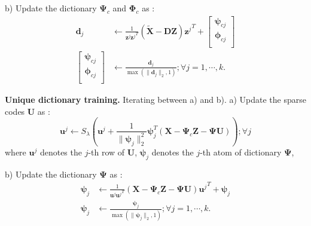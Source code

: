 \documentclass{article}
\begin{document}
\begin{algorithm}[t]
\begin{algorithmic}[1]
			\STATE
			b) Update the dictionary $\boldsymbol{\Psi}_{c}$ and $\boldsymbol{\Phi}_{c}$ as :
			\begin{align*}
			\mathbf{d}_j &\leftarrow \frac{1}{\mathbf{z}^j {\mathbf{z}^j}^T} (\widetilde{\mathbf{X}} - \mathbf{D}\mathbf{Z}) {\mathbf{z}^j}^T +
			\begin{bmatrix}
			\boldsymbol{\psi}_{cj}  \\
			\boldsymbol{\phi}_{cj}  \\
			\end{bmatrix}
			\\
			\begin{bmatrix}
			\boldsymbol{\psi}_{cj}  \\
			\boldsymbol{\phi}_{cj}  \\
			\end{bmatrix}
			&\leftarrow \frac{\mathbf{d}_j}{\max(\|\mathbf{d}_j \|_2, 1)} 
			; \forall j=1,\cdots, k.
			\end{align*}
			
			\STATE
			\textbf{Unique dictionary training.} Iterating between a) and b).
			\STATE
			a) Update the sparse codes $\mathbf{U}$ as :
			\begin{equation*}
			\mathbf{u}^j \leftarrow S_\lambda\left( \mathbf{u}^j + \frac{1}{\|\boldsymbol{\psi}_j \|_2^2} \boldsymbol{\psi}_j^T (\mathbf{X} - \boldsymbol{\Psi}_c \mathbf{Z} - \boldsymbol{\Psi} \mathbf{U}) \right) ; \forall j
			\end{equation*}
			where $\mathbf{u}^j$ denotes the $j$-th row of $\mathbf{U}$, $\boldsymbol{\psi}_j$ denotes the $j$-th atom of dictionary $\boldsymbol{\Psi}$,
			
			\STATE
			b) Update the dictionary $\boldsymbol{\Psi}$ as :
			\begin{align*}
			\boldsymbol{\psi}_j &\leftarrow \frac{1}{\mathbf{u}^j {\mathbf{u}^j}^T} (\mathbf{X} - \boldsymbol{\Psi}_c \mathbf{Z} - \boldsymbol{\Psi} \mathbf{U}) {\mathbf{u}^j}^T + \boldsymbol{\psi}_j 
			\\
			\boldsymbol{\psi}_j
			&\leftarrow \frac{\boldsymbol{\psi}_j}{\max(\|\boldsymbol{\psi}_j \|_2, 1)} 
			; \forall j=1,\cdots, k.
			\end{align*}
			

\end{algorithmic}
\end{algorithm}
\end{document}
